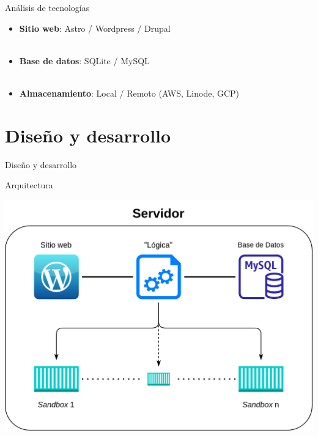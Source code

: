     \begin{frame}{Análisis de tecnologías}


        \begin{itemize}
            \item \textbf{Sitio web}: Astro / Wordpress / Drupal
            \\~\\
            \item \textbf{Base de datos}: SQLite / MySQL
            \\~\\
            \item \textbf{Almacenamiento}: Local / Remoto (AWS, Linode, GCP) 
        \end{itemize}
    \end{frame}


\section{Diseño y desarrollo}

    \begin{frame}
        \Huge{\centerline{Diseño y desarrollo}}
    \end{frame}

    \begin{frame}{Arquitectura}
        \centering

        \includegraphics[scale=0.15]{images/diagramas/arquitectura.png}
    \end{frame}

